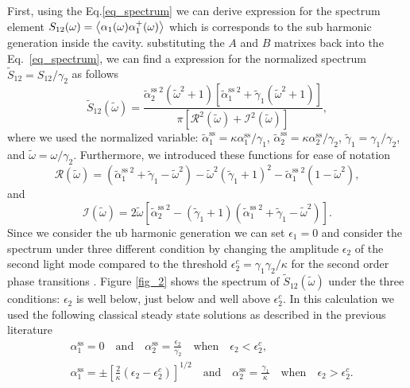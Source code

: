 \documentclass[fleqn,11pt]{wlscirep}
\begin{document}
First, using the Eq.\eqref{eq_spectrum} we can derive expression for the spectrum element $S_{12}(\omega) = \expval{\alpha_1(\omega)\alpha_1^+(\omega)}$ which is corresponds to the sub harmonic generation inside the cavity. substituting the $A$ and $B$ matrixes back into the Eq.~\eqref{eq_spectrum}, we can find a expression for the normalized spectrum $\tilde{S}_{12} = S_{12}/\gamma_2$ as follows
\begin{equation}
	\tilde{S}_{12}(\tilde{\omega}) = 
	\frac{
		\tilde{\alpha}_2^{\text{ss}\;2}(\tilde{\omega}^2 + 1)\left[\tilde{\alpha}_1^{\text{ss}\;2} + \tilde{\gamma}_1(\tilde{\omega}^2 + 1)\right]
	}{\pi \left[\mathcal{R}^2(\tilde{\omega}) + \mathcal{I}^2(\tilde{\omega})\right]},
\end{equation}
where we used the normalized variable: 
$\tilde{\alpha}_1^{\text{ss}} = \kappa{\alpha}_1^{\text{ss}}/\gamma_1$, 
$\tilde{\alpha}_2^{\text{ss}} = \kappa{\alpha}_2^{\text{ss}}/\gamma_2$, 
$\tilde{\gamma}_1 = \gamma_1/\gamma_2$, and 
$\tilde{\omega} = \omega/\gamma_2$. 
Furthermore, we introduced these functions for ease of notation
\begin{equation}
	\mathcal{R}(\tilde{\omega}) = 
	(\tilde{\alpha}_1^{\text{ss}\;2} + \tilde{\gamma}_1 - \tilde{\omega}^2 ) -
	\tilde{\omega}^2(\tilde{\gamma}_1 + 1)^2 -
	\tilde{\alpha}_1^{\text{ss}\;2}(1 - \tilde{\omega}^2),
\end{equation}
and 
\begin{equation}
	\mathcal{I}(\tilde{\omega}) = 
	2\tilde{\omega}
	\left[
	\tilde{\alpha}_2^{\text{ss}\;2} -
	(\tilde{\gamma}_1 +1)(\tilde{\alpha}_1^{\text{ss}\;2} + \tilde{\gamma}_1 - \tilde{\omega}^2 )
	\right].
\end{equation}
Since we consider the ub harmonic generation we can set $\epsilon_1 = 0$ and consider the spectrum under three different condition by changing the amplitude $\epsilon_2$ of the second light mode compared to the threshold $\epsilon_2^c = \gamma_1\gamma_2/\kappa$ for the second order phase transitions \cite{drummond1980n}. Figure \ref{fig_2} shows the spectrum of $\tilde{S}_{12}(\tilde{\omega})$ under the three conditions: $\epsilon_2$ is well below, just below and well above $\epsilon_2^c$. In this calculation we used the following classical steady state solutions as described in the previous literature \cite{drummond1980n,walls2008,mcneil1978}
\begin{equation} 
	\begin{aligned}
	&{\alpha}_1^{\text{ss}} = 0 \quad \text{and} \quad 
	{\alpha}_2^{\text{ss}} = \frac{\epsilon_2}{\gamma_2} \quad \text{when} \quad
	\epsilon_2 < \epsilon_2^c, \\
	&
	{\alpha}_1^{\text{ss}} = \pm \left[ \frac{2}{\kappa}(\epsilon_2 - \epsilon_2^c) \right]^{1/2} \quad \text{and} \quad 
	{\alpha}_2^{\text{ss}} = \frac{\gamma_1}{\kappa} \quad \text{when} \quad
	\epsilon_2 > \epsilon_2^c.
	\end{aligned}
\end{equation}
\end{document}
